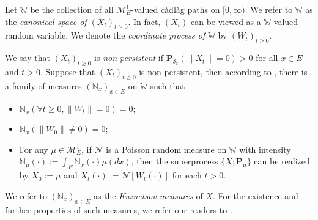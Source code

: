 \documentclass[12pt,a4paper]{amsart}
\theoremstyle{definition}
\numberwithin{equation}{section}
\begin{document}
Let $\mathbb W$ be the collection of all $\mathcal M^1_E$-valued c\`{a}dl\`{a}g paths on $[0,\infty)$.
We refer to $\mathbb W$ as the \emph{canonical space of $(X_t)_{t\geq 0}$}.
In fact, $(X_t)$ can be viewed as a $\mathbb W$-valued random variable.
We denote the \emph{coordinate process of $\mathbb W$} by $(W_t)_{t\geq 0}$.

We say that $(X_t)_{t\geq 0}$ is \emph{non-persistent} if $\mathbf P_{\delta_x}(\|X_t\|= 0) > 0$ for all $x\in E$ and $t> 0$.
Suppose that $(X_t)_{t\geq 0}$ is non-persistent, then according to \cite[Section 8.4]{Li2011Measure-valued}, there is a family of measures $(\mathbb N_x)_{x\in E}$ on $\mathbb W$ such that
\begin{itemize}
\item
	$\mathbb N_x (\forall t \geq 0, \|W_t\|=0) =0$;
\item
	$\mathbb N_x(\|W_0 \|\neq 0) = 0$;
\item
	For any $\mu \in \mathcal M_E^1$, if $\mathcal N$ is a Poisson random measure on $\mathbb W$ with intensity $\mathbb N_\mu(\cdot):= \int_E \mathbb N_x(\cdot )\mu(dx)$, then the superprocess $\{X;\mathbf P_\mu\}$ can be realized by $\widetilde X_0 := \mu$ and $\widetilde X_t(\cdot) := \mathcal N[W_t(\cdot)]$ for each $t>0$.
\end{itemize}
We refer to $(\mathbb N_x)_{x\in E}$ as the \emph{Kuznetsov measures} of $X$.
For the existence and further properties of such measures, we refer our readers to \cite{Li2011Measure-valued}.
\end{document}
